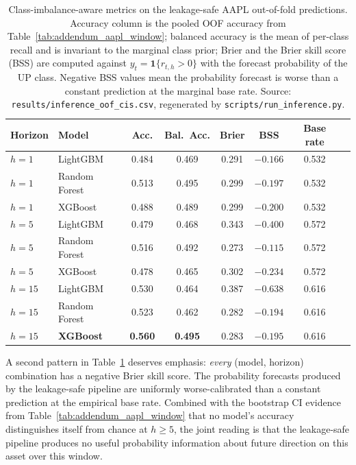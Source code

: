 \documentclass{rQUF2e}
\begin{document}
\begin{table}[H]
\centering
\caption{Class-imbalance-aware metrics on the leakage-safe AAPL
out-of-fold predictions. Accuracy column is the pooled OOF
accuracy from Table~\ref{tab:addendum_aapl_window}; balanced
accuracy is the mean of per-class recall and is invariant to
the marginal class prior; Brier and the Brier skill score (BSS)
are computed against $y_t = \mathbf{1}\{r_{t,h} > 0\}$ with the
forecast probability of the UP class. Negative BSS values mean
the probability forecast is worse than a constant prediction
at the marginal base rate. Source:
\texttt{results/inference\_oof\_cis.csv}, regenerated by
\texttt{scripts/run\_inference.py}.}
\label{tab:addendum_imbalance_metrics}
\scriptsize
\begin{tabular}{llcccccc}
\toprule
\textbf{Horizon} & \textbf{Model} & \textbf{Acc.} & \textbf{Bal.\ Acc.} & \textbf{Brier} & \textbf{BSS} & \textbf{Base rate} \\
\midrule
$h=1$  & LightGBM      & 0.484 & 0.469 & 0.291 & $-0.166$ & 0.532 \\
$h=1$  & Random Forest & 0.513 & 0.495 & 0.299 & $-0.197$ & 0.532 \\
$h=1$  & XGBoost       & 0.488 & 0.489 & 0.299 & $-0.200$ & 0.532 \\
$h=5$  & LightGBM      & 0.479 & 0.468 & 0.343 & $-0.400$ & 0.572 \\
$h=5$  & Random Forest & 0.516 & 0.492 & 0.273 & $-0.115$ & 0.572 \\
$h=5$  & XGBoost       & 0.478 & 0.465 & 0.302 & $-0.234$ & 0.572 \\
$h=15$ & LightGBM      & 0.530 & 0.464 & 0.387 & $-0.638$ & 0.616 \\
$h=15$ & Random Forest & 0.523 & 0.462 & 0.282 & $-0.194$ & 0.616 \\
$h=15$ & \textbf{XGBoost}       & \textbf{0.560} & \textbf{0.495} & 0.283 & $-0.195$ & 0.616 \\
\bottomrule
\end{tabular}
\end{table}

\noindent A second pattern in
Table~\ref{tab:addendum_imbalance_metrics} deserves emphasis:
\emph{every} (model, horizon) combination has a negative Brier
skill score. The probability forecasts produced by the
leakage-safe pipeline are uniformly worse-calibrated than a
constant prediction at the empirical base rate. Combined with
the bootstrap CI evidence from
Table~\ref{tab:addendum_aapl_window} that no model's accuracy
distinguishes itself from chance at $h \ge 5$, the joint
reading is that the leakage-safe pipeline produces no useful
probability information about future direction on this asset
over this window.
\end{document}
